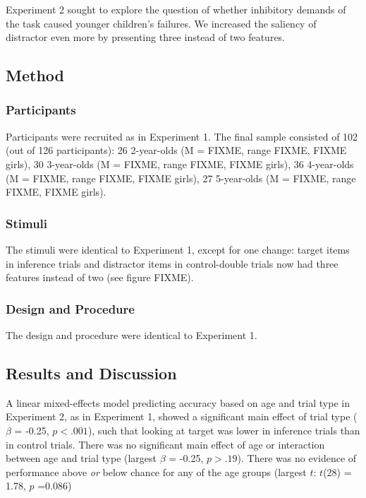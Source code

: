 \documentclass[a4paper,man,apacite,floatsintext]{apa6}
\begin{document}
Experiment 2 sought to explore the question of whether inhibitory
demands of the task caused younger children's failures. We increased the
saliency of distractor even more by presenting three instead of two
features.

\subsection{Method}\label{method-1}

\subsubsection{Participants}\label{participants-1}

Participants were recruited as in Experiment 1. The final sample
consisted of 102 (out of 126 participants): 26 2-year-olds (M = FIXME,
range FIXME, FIXME girls), 30 3-year-olds (M = FIXME, range FIXME, FIXME
girls), 36 4-year-olds (M = FIXME, range FIXME, FIXME girls), 27
5-year-olds (M = FIXME, range FIXME, FIXME girls).

\subsubsection{Stimuli}\label{stimuli}

The stimuli were identical to Experiment 1, except for one change:
target items in inference trials and distractor items in control-double
trials now had three features instead of two (see figure FIXME).

\subsubsection{Design and Procedure}\label{design-and-procedure}

The design and procedure were identical to Experiment 1.

\subsection{Results and Discussion}\label{results-and-discussion-1}

A linear mixed-effects model predicting accuracy based on age and trial
type in Experiment 2, as in Experiment 1, showed a significant main
effect of trial type (\(\beta\) = -0.25, \(p <.001\)), such that looking
at target was lower in inference trials than in control trials. There
was no significant main effect of age or interaction between age and
trial type (largest \(\beta\) = -0.25, \(p >.19\)). There was no
evidence of performance above \emph{or} below chance for any of the age
groups (largest \(t\): \(t\)(28) = 1.78, \(p\) =0.086)
\end{document}
